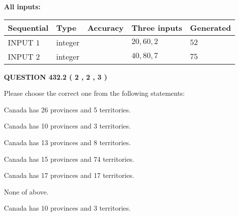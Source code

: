 \documentclass[12pt]{article}
\begin{document}
   
   
   
\noindent{}
   
   
   
   
\noindent\vspace{0.1in}\hspace{-0.08in} {\textbf{\Large{All inputs: }}}
   
   
  
  
\noindent\begin{tabular}{|l|l|l|l|l|}
\hline
 Sequential & Type & Accuracy & Three inputs & Generated \\ 
\hline
 
 
  INPUT $  1 $ & integer &  & $
 20
 , 
 60
 , 
 2
 $ & $ 52 $ 
 \\  \hline  
 
 
  INPUT $  2 $ & integer &  & $
 40
 , 
 80
 , 
 7
 $ & $ 75 $ 
 \\  \hline  
 \end{tabular}
   
   
  
\vspace{0.2in}
  
{\textbf{\Large{QUESTION
432.2 
 ( 2 , 2 , 3 )
}}}
  
  
Please choose the correct one from the following statements:
 
 
Canada has  26 provinces and  5 territories.
 
 
Canada has 10  provinces and 3 territories.
 
 
Canada has  13 provinces and  8 territories.
 
 
Canada has  15 provinces and  74 territories.
 
 
Canada has  17 provinces and  17 territories.
 
 
 None of above.
 
 
\noindent{}
 
 
Canada has 10  provinces and 3 territories.
 
 
\noindent{}
 
 
   
\end{document}
